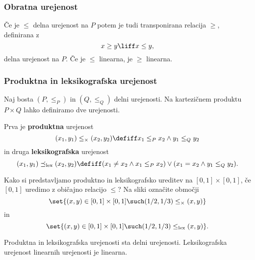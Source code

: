 \subsubsection{Obratna urejenost}

Če je $\leq$ delna urejenost na $P$ potem je tudi transponirana relacija $\geq$, definirana z
%
\begin{equation*}
    x \geq y \liff x \leq y,
\end{equation*}
%
delna urejenost na $P$. Če je $\leq$ linearna, je $\geq$ linearna.

\subsubsection{Produktna in leksikografska urejenost}

Naj bosta $(P, {\leq_P})$ in $(Q, {\leq_Q})$ delni urejenosti. Na kartezičnem produktu $P \times Q$ lahko definiramo dve urejenosti.

Prva je \textbf{produktna} urejenost
%
\begin{equation*}
  (x_1,y_1) \leq_{\times} (x_2,y_2) \defiff x_1 \leq_P x_2 \land y_1 \leq_Q y_2
\end{equation*}
%
in druga \textbf{leksikografska} urejenost
%
\begin{equation*}
  (x_1,y_1) \preceq_\mathrm{lex} (x_2,y_2)
  \defiff (x_1 \neq x_2 \land x_1 \leq_P x_2) \lor (x_1 = x_2 \land y_1 \leq_Q y_2).
\end{equation*}


\begin{naloga}
  Kako si predstavljamo produktno in leksikografsko ureditev na $[0,1] \times [0,1]$, če $[0,1]$ uredimo z običajno relacijo $\leq$? Na sliki označite območji
  \begin{equation*}
    \set{(x,y) \in [0,1] \times [0, 1] \such (1/2,1/3) \leq_\times (x,y)}
  \end{equation*}
  in
  \begin{equation*}
    \set{(x,y) \in [0,1] \times [0, 1] \such (1/2,1/3) \leq_\mathrm{lex} (x,y)}.
  \end{equation*}
\end{naloga}

\begin{izjava}
  Produktna in leksikografska urejenosti sta delni urejenosti. Leksikografska urejenost linearnih urejenosti je linearna.
\end{izjava}

